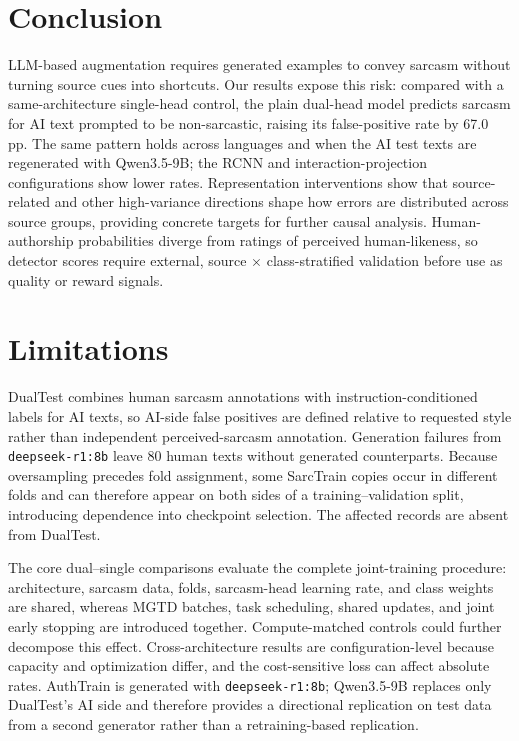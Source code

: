 \documentclass[11pt]{article}
\begin{document}
\section{Conclusion}
\label{sec:conclusion}

LLM-based augmentation requires generated examples to convey sarcasm without turning source cues into shortcuts. Our results expose this risk: compared with a same-architecture single-head control, the plain dual-head model predicts sarcasm for AI text prompted to be non-sarcastic, raising its false-positive rate by 67.0 pp. The same pattern holds across languages and when the AI test texts are regenerated with Qwen3.5-9B; the RCNN and interaction-projection configurations show lower rates. Representation interventions show that source-related and other high-variance directions shape how errors are distributed across source groups, providing concrete targets for further causal analysis. Human-authorship probabilities diverge from ratings of perceived human-likeness, so detector scores require external, source $\times$ class-stratified validation before use as quality or reward signals.

\section*{Limitations}

DualTest combines human sarcasm annotations with instruction-conditioned labels for AI texts, so AI-side false positives are defined relative to requested style rather than independent perceived-sarcasm annotation. Generation failures from \texttt{deepseek-r1:8b} leave 80 human texts without generated counterparts. Because oversampling precedes fold assignment, some SarcTrain copies occur in different folds and can therefore appear on both sides of a training--validation split, introducing dependence into checkpoint selection. The affected records are absent from DualTest.

The core dual--single comparisons evaluate the complete joint-training procedure: architecture, sarcasm data, folds, sarcasm-head learning rate, and class weights are shared, whereas MGTD batches, task scheduling, shared updates, and joint early stopping are introduced together. Compute-matched controls could further decompose this effect. Cross-architecture results are configuration-level because capacity and optimization differ, and the cost-sensitive loss can affect absolute rates. AuthTrain is generated with \texttt{deepseek-r1:8b}; Qwen3.5-9B replaces only DualTest's AI side and therefore provides a directional replication on test data from a second generator rather than a retraining-based replication.
\end{document}
